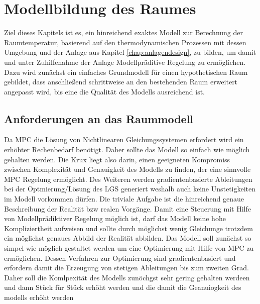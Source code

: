 %
%

\renewcommand{\chapterheadstartvskip}{\vspace*{2cm}}

\chapter{Modellbildung des Raumes}
\label{chap:modellbildung}

Ziel dieses Kapitels ist es, ein hinreichend exaktes Modell zur Berechnung der Raumtemperatur, basierend auf den thermodynamischen Prozessen mit dessen Umgebung und der Anlage aus Kapitel \ref{chap:anlagendesign}, zu bilden, um damit und unter Zuhilfenahme der Anlage Modellpräditive Regelung zu ermöglichen.
Dazu wird zunächst ein einfaches Grundmodell für einen hypothetischen Raum gebildet, dass anschließend schrittweise an den bestehenden Raum erweitert angepasst wird, bis eine die Qualität des Modells ausreichend ist.

\section{Anforderungen an das Raummodell}
Da MPC die Lösung von Nichtlinearen Gleichungssystemen erfordert wird ein erhöhter Rechenbedarf benötigt. Daher sollte das Modell so einfach wie möglich gehalten werden. Die Krux liegt also darin, einen geeigneten Kompromiss zwischen Komplexität und Genauigkeit des Modells zu finden, der eine sinnvolle MPC Regelung ermöglicht.
Des Weiteren werden gradientenbasierte Ableitungen bei der Optmierung/Lösung des LGS generiert weshalb auch keine Unstetigkeiten im Modell vorkommen dürfen.
Die triviale Aufgabe ist die hinreichend genaue Beschreibung der Realität bzw realen Vorgänge.
Damit eine Steuerung mit Hilfe von Modellprädiktiver Regelung möglich ist, darf das Modell keine hohe Kompliziertheit aufweisen und sollte durch möglichst wenig Gleichunge trotzdem ein möglichst genaues Abbild der Realität abbilden.
Das Modell soll zunächst so simpel wie möglich gestaltet werden um eine Optimierung mit Hilfe von MPC zu ermöglichen. Dessen Verfahren zur Optimierung sind gradientenbasiert und erfordern damit die Erzeugung von stetigen Ableitungen bis zum zweiten Grad. Daher soll die Komlpexität des Modells zunöchgst sehr gering gehalten werdeen und dann Stück für Stück erhöht werden und die damit die Geanuiogkeit des modells erhöht werden

